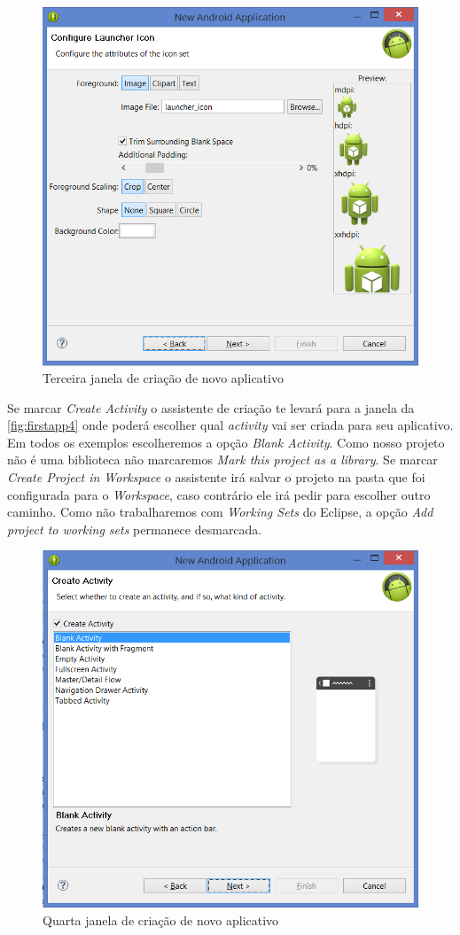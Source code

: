 \documentclass[a4paper,12pt,brazil,oneside]{book}
\begin{document}
\begin{singlespace}
\begin{figure}[H]
  \centering
  \includegraphics[width=.75\textwidth]{figuras/firstapp/firstapp3.png}
  \caption{Terceira janela de criação de novo aplicativo}
  \label{fig:firstapp3}
\end{figure}
  
Se marcar \emph{Create Activity}  o assistente de criação te levará para a janela da \autoref{fig:firstapp4} onde poderá escolher qual \emph{activity} vai ser criada para seu aplicativo. Em todos os exemplos escolheremos a opção \emph{Blank Activity}. Como nosso projeto não é uma biblioteca não marcaremos \emph{Mark this project as a library}. Se marcar \emph{Create Project in Workspace} o assistente irá salvar o projeto na pasta que foi configurada para o \emph{Workspace}, caso contrário ele irá pedir para escolher outro caminho. Como não trabalharemos com \emph{Working Sets} do Eclipse, a opção \emph{Add project to working sets} permanece desmarcada. 
  
\begin{figure}[H]
  \centering
  \includegraphics[width=.75\textwidth]{figuras/firstapp/firstapp4.png}
  \caption{Quarta janela de criação de novo aplicativo}
  \label{fig:firstapp4}
\end{figure}
 

\end{singlespace}
\end{document}
